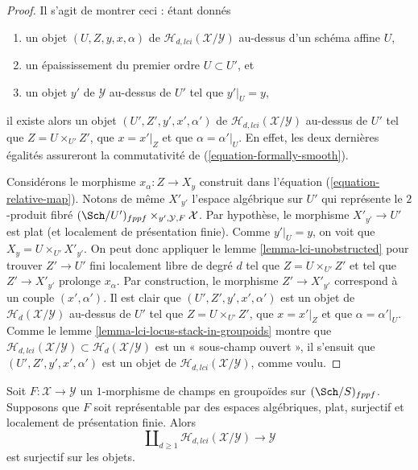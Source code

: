 \begin{proof}
Il s'agit de montrer ceci : étant donnés
\begin{enumerate}
\item un objet $(U, Z, y, x, \alpha)$ de
$\mathcal{H}_{d, lci}(\mathcal{X}/\mathcal{Y})$ au-dessus d'un schéma affine $U$,
\item un épaississement du premier ordre $U \subset U'$, et
\item un objet $y'$ de $\mathcal{Y}$ au-dessus de $U'$ tel que $y'|_U = y$,
\end{enumerate}
il existe alors un objet $(U', Z', y', x', \alpha')$ de
$\mathcal{H}_{d, lci}(\mathcal{X}/\mathcal{Y})$ au-dessus de $U'$ tel que
$Z = U \times_{U'} Z'$, que $x = x'|_Z$ et que
$\alpha = \alpha'|_U$. En effet, les deux dernières égalités assureront
la commutativité de (\ref{equation-formally-smooth}).

\medskip\noindent
Considérons le morphisme $x_\alpha : Z \to X_y$ construit dans
l'équation (\ref{equation-relative-map}). Notons de même $X'_{y'}$
l'espace algébrique sur $U'$ qui représente le $2$-produit fibré
$(\Sch/U')_{fppf} \times_{y', \mathcal{Y}, F} \mathcal{X}$.
Par hypothèse, le morphisme $X'_{y'} \to U'$ est plat (et localement de
présentation finie). Comme $y'|_U = y$, on voit que $X_y = U \times_{U'} X'_{y'}$.
On peut donc appliquer le
lemme \ref{lemma-lci-unobstructed}
pour trouver $Z' \to U'$ fini localement libre de degré $d$ tel que
$Z = U \times_{U'} Z'$ et tel que $Z' \to X'_{y'}$ prolonge $x_\alpha$.
Par construction, le morphisme $Z' \to X'_{y'}$ correspond à un couple
$(x', \alpha')$. Il est clair que $(U', Z', y', x', \alpha')$
est un objet de $\mathcal{H}_d(\mathcal{X}/\mathcal{Y})$ au-dessus de $U'$
tel que $Z = U \times_{U'} Z'$, que $x = x'|_Z$ et que
$\alpha = \alpha'|_U$. Comme le
lemme \ref{lemma-lci-locus-stack-in-groupoids}
montre que $\mathcal{H}_{d, lci}(\mathcal{X}/\mathcal{Y}) \subset
\mathcal{H}_d(\mathcal{X}/\mathcal{Y})$ est un « sous-champ ouvert »,
il s'ensuit que $(U', Z', y', x', \alpha')$ est un objet de
$\mathcal{H}_{d, lci}(\mathcal{X}/\mathcal{Y})$, comme voulu.
\end{proof}

\begin{lemma}
\label{lemma-lci-surjective}
Soit $F : \mathcal{X} \to \mathcal{Y}$ un $1$-morphisme de champs en groupoïdes
sur $(\Sch/S)_{fppf}$. Supposons que $F$ soit représentable par des espaces
algébriques, plat, surjectif et localement de présentation finie. Alors
$$
\coprod\nolimits_{d \geq 1} \mathcal{H}_{d, lci}(\mathcal{X}/\mathcal{Y})
\longrightarrow
\mathcal{Y}
$$
est surjectif sur les objets.
\end{lemma}

